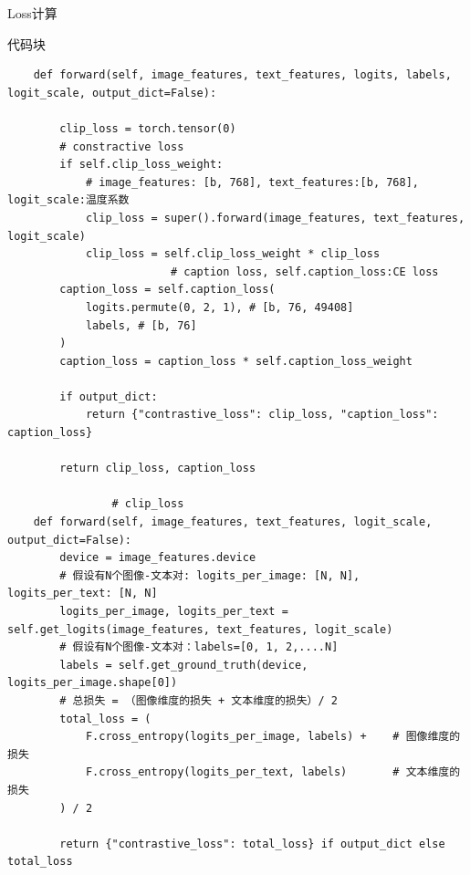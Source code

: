 \documentclass[zihao=false,fontset=windows]{ctexart}
\newcommand{\codehead}{{\small\ttfamily\color{feishuGray}代码块}\par\vspace{-0.15em}}
\begin{document}
Loss计算\par
\begin{feishucode}
\codehead
\begin{lstlisting}
    def forward(self, image_features, text_features, logits, labels, logit_scale, output_dict=False):
        
        clip_loss = torch.tensor(0)
        # constractive loss
        if self.clip_loss_weight:
            # image_features: [b, 768], text_features:[b, 768], logit_scale:温度系数
            clip_loss = super().forward(image_features, text_features, logit_scale)
            clip_loss = self.clip_loss_weight * clip_loss
                         # caption loss, self.caption_loss:CE loss
        caption_loss = self.caption_loss(
            logits.permute(0, 2, 1), # [b, 76, 49408]
            labels, # [b, 76]
        )
        caption_loss = caption_loss * self.caption_loss_weight

        if output_dict:
            return {"contrastive_loss": clip_loss, "caption_loss": caption_loss}

        return clip_loss, caption_loss

                # clip_loss
    def forward(self, image_features, text_features, logit_scale, output_dict=False):
        device = image_features.device
        # 假设有N个图像-文本对: logits_per_image: [N, N], logits_per_text: [N, N]
        logits_per_image, logits_per_text = self.get_logits(image_features, text_features, logit_scale)
        # 假设有N个图像-文本对：labels=[0, 1, 2,....N]
        labels = self.get_ground_truth(device, logits_per_image.shape[0])
        # 总损失 = （图像维度的损失 + 文本维度的损失）/ 2
        total_loss = (
            F.cross_entropy(logits_per_image, labels) +    # 图像维度的损失
            F.cross_entropy(logits_per_text, labels)       # 文本维度的损失
        ) / 2

        return {"contrastive_loss": total_loss} if output_dict else total_loss
\end{lstlisting}
\end{feishucode}
\end{document}
